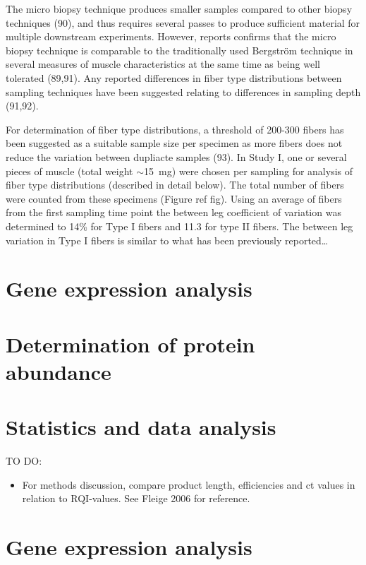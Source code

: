 \documentclass[twoside,10pt]{gihclass} %
\providecommand{\tightlist}{%
  \setlength{\itemsep}{0pt}\setlength{\parskip}{0pt}}
\begin{document}
The micro biopsy technique produces smaller samples compared to other
biopsy techniques
(90), and thus
requires several passes to produce sufficient material for multiple
downstream experiments. However, reports confirms that the micro biopsy
technique is comparable to the traditionally used Bergström technique in
several measures of muscle characteristics at the same time as being
well tolerated (89,91). Any reported differences in fiber type
distributions between sampling techniques have been suggested relating
to differences in sampling depth (91,92).

For determination of fiber type distributions, a threshold of 200-300
fibers has been suggested as a suitable sample size per specimen as more
fibers does not reduce the variation between dupliacte samples
(93).
In Study I, one or several pieces of muscle (total weight
\(\sim\)\SI{15}{mg}) were chosen per sampling for analysis of fiber type
distributions (described in detail below). The total number of fibers
were counted from these specimens (Figure ref fig). Using an average of
fibers from the first sampling time point the between leg coefficient of
variation was determined to 14\% for Type I fibers and 11.3 for type II
fibers. The between leg variation in Type I fibers is similar to what
has been previously reported\ldots{}

\hypertarget{gene-expression-analysis}{%
\section{Gene expression analysis}\label{gene-expression-analysis}}

\hypertarget{determination-of-protein-abundance}{%
\section{Determination of protein abundance}\label{determination-of-protein-abundance}}

\hypertarget{statistics-and-data-analysis}{%
\section{Statistics and data analysis}\label{statistics-and-data-analysis}}

TO DO:
\begin{itemize}
\tightlist
\item
  For methods discussion, compare product length, efficiencies and ct
  values in relation to RQI-values. See Fleige 2006 for reference.
\end{itemize}
\hypertarget{gene-expression-analysis-1}{%
\section{Gene expression analysis}\label{gene-expression-analysis-1}}
\end{document}
